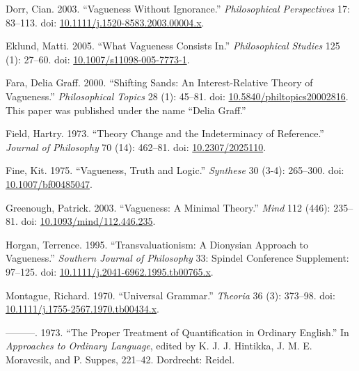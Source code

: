 \documentclass[
  10pt,
  letterpaper,
  DIV=11,
  numbers=noendperiod,
  twoside]{scrartcl}
\newlength{\cslhangindent}
\newenvironment{CSLReferences}[2] %
 {\begin{list}{}{%
  \setlength{\itemindent}{0pt}
  \setlength{\leftmargin}{0pt}
  \setlength{\parsep}{0pt}
  \ifodd #1
   \setlength{\leftmargin}{\cslhangindent}
   \setlength{\itemindent}{-1\cslhangindent}
  \fi
  \setlength{\itemsep}{#2\baselineskip}}}
 {\end{list}}
\begin{document}
\label{refs}
\begin{CSLReferences}{1}{0}
Dorr, Cian. 2003. {``Vagueness Without Ignorance.''} \emph{Philosophical
Perspectives} 17: 83--113. doi:
\href{https://doi.org/10.1111/j.1520-8583.2003.00004.x}{10.1111/j.1520-8583.2003.00004.x}.

Eklund, Matti. 2005. {``What Vagueness Consists In.''}
\emph{Philosophical Studies} 125 (1): 27--60. doi:
\href{https://doi.org/10.1007/s11098-005-7773-1}{10.1007/s11098-005-7773-1}.

Fara, Delia Graff. 2000. {``Shifting Sands: An Interest-Relative Theory
of Vagueness.''} \emph{Philosophical Topics} 28 (1): 45--81. doi:
\href{https://doi.org/10.5840/philtopics20002816}{10.5840/philtopics20002816}.
This paper was published under the name {``Delia Graff.''}

Field, Hartry. 1973. {``Theory Change and the Indeterminacy of
Reference.''} \emph{Journal of Philosophy} 70 (14): 462--81. doi:
\href{https://doi.org/10.2307/2025110}{10.2307/2025110}.

Fine, Kit. 1975. {``Vagueness, Truth and Logic.''} \emph{Synthese} 30
(3-4): 265--300. doi:
\href{https://doi.org/10.1007/bf00485047}{10.1007/bf00485047}.

Greenough, Patrick. 2003. {``Vagueness: A Minimal Theory.''} \emph{Mind}
112 (446): 235--81. doi:
\href{https://doi.org/10.1093/mind/112.446.235}{10.1093/mind/112.446.235}.

Horgan, Terrence. 1995. {``Transvaluationism: A Dionysian Approach to
Vagueness.''} \emph{Southern Journal of Philosophy} 33: Spindel
Conference Supplement: 97--125. doi:
\href{https://doi.org/10.1111/j.2041-6962.1995.tb00765.x}{10.1111/j.2041-6962.1995.tb00765.x}.

Montague, Richard. 1970. {``Universal Grammar.''} \emph{Theoria} 36 (3):
373--98. doi:
\href{https://doi.org/10.1111/j.1755-2567.1970.tb00434.x}{10.1111/j.1755-2567.1970.tb00434.x}.

---------. 1973. {``The Proper Treatment of Quantification in Ordinary
English.''} In \emph{Approaches to Ordinary Language}, edited by K. J.
J. Hintikka, J. M. E. Moravcsik, and P. Suppes, 221--42. Dordrecht:
Reidel.


\end{CSLReferences}
\end{document}
